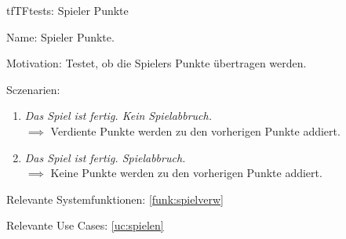 \begin{description}[leftmargin=5em, style=sameline]

\begin{lhp}{tf}{TF}{tests: Spieler Punkte }
	\item [Name:] Spieler Punkte.
	\item [Motivation:] Testet, ob die Spielers Punkte übertragen werden.
	\item [Sczenarien:] \hfill
		\begin{enumerate}
			\item \textit{Das Spiel ist fertig. Kein Spielabbruch.} \\ $\implies$ Verdiente Punkte werden zu den vorherigen Punkte addiert.
			\item \textit{Das Spiel ist fertig. Spielabbruch.} \\ $\implies$ Keine Punkte werden zu den vorherigen Punkte addiert.
		\end{enumerate}
	\item [Relevante Systemfunktionen:] \ref{funk:spielverw}
	\item [Relevante Use Cases:] \ref{uc:spielen}
\end{lhp}

\end{description}






























